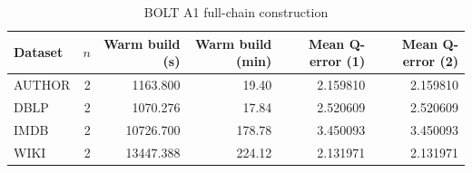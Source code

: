 \begin{table}[H]
\centering
\small
\setlength{\tabcolsep}{5pt}
\caption{BOLT A1 full-chain construction}
\label{tab:E_A1_fullchain_warm}
\begin{tabular}{@{}lrrrrr@{}}
\toprule
Dataset & $n$ & Warm build (s) & Warm build (min) & Mean Q-error (1) & Mean Q-error (2) \\
\midrule
AUTHOR & 2 & 1163.800 & 19.40 & 2.159810 & 2.159810 \\
DBLP & 2 & 1070.276 & 17.84 & 2.520609 & 2.520609 \\
IMDB & 2 & 10726.700 & 178.78 & 3.450093 & 3.450093 \\
WIKI & 2 & 13447.388 & 224.12 & 2.131971 & 2.131971 \\
\bottomrule
\end{tabular}
\end{table}
